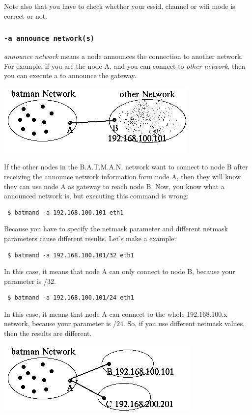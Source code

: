\documentclass[
	12pt,
	a4paper,
	twoside,
	english,
	headsepline,
	footnosepline,
	automark,
	normalheadings,
	openany,
	cleardoubleplain,
	abstracton,
	idxtotoc,
	liststotoc,
	bibtotoc,
 	BCOR8mm,
]{scrartcl}
\newcommand{\subsubsectionttt}[1]{\subsubsection{\texttt{#1}}}
\begin{document}
Note also that you have to check whether your essid, channel or wifi mode is
correct or not.

\subsubsectionttt{-a announce network(s)}
\emph{announce network} means a node announces the connection to another
network. For example, if you are the node A, and you can connect to \emph{other
network}, then you can execute a to announce the gateway.

\begin{center}
\includegraphics[scale=0.8]{announce_networks}
\end{center}

If the other nodes in the B.A.T.M.A.N. network want to connect to node B after
receiving the announce network information form node A, then they will know they
can use node A as gateway to reach node B. Now, you know what a announced
network is, but executing this command is wrong:
\begin{verbatim}
 $ batmand -a 192.168.100.101 eth1
\end{verbatim}

Because you have to specify the netmask parameter and different netmask
parameters cause different results. Let's make a example:
\begin{verbatim}
 $ batmand -a 192.168.100.101/32 eth1
\end{verbatim}
In this case, it means that node A can only connect to node B, because your
parameter is /32.

\begin{verbatim}
 $ batmand -a 192.168.100.101/24 eth1
\end{verbatim}
In this case, it means that node A can connect to the whole 192.168.100.x
network, because your parameter is /24. So, if you use different netmask values,
then the results are different.

\begin{center}
\includegraphics[scale=0.8]{multiple_announces}
\end{center}
\end{document}
